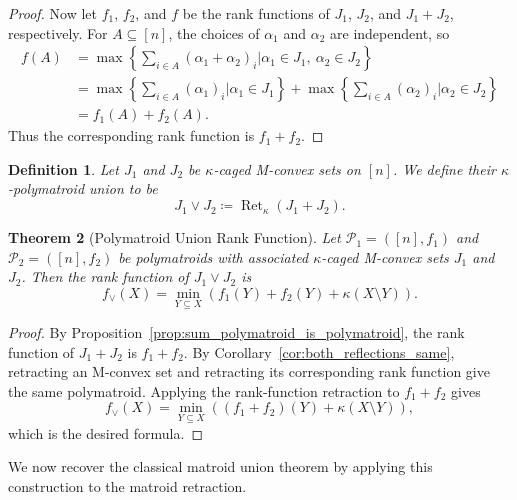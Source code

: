 \documentclass[10pt,a4paper]{amsart}
\newtheorem{theorem}{Theorem}[section]
\newtheorem{definition}[theorem]{Definition}
\DeclareMathOperator{\Ret}{Ret}                %
\newcommand{\RetK}{\Ret_{\kappa}}              %
\begin{document}
\begin{proof}
    Now let $f_1$, $f_2$, and $f$ be the rank functions of $J_1$, $J_2$,
    and $J_1+J_2$, respectively. For $A\subseteq[n]$, the choices of
    $\alpha_1$ and $\alpha_2$ are independent, so
    \begin{align*}
        f(A)
        &=
        \max\left\{
            \sum_{i\in A}(\alpha_1+\alpha_2)_i
            \mathrel{\Big|}
            \alpha_1\in J_1,\ \alpha_2\in J_2
        \right\}\\
        &=
        \max\left\{
            \sum_{i\in A}(\alpha_1)_i
            \mathrel{\Big|}
            \alpha_1\in J_1
        \right\}
        +
        \max\left\{
            \sum_{i\in A}(\alpha_2)_i
            \mathrel{\Big|}
            \alpha_2\in J_2
        \right\}\\
        &=f_1(A)+f_2(A).
    \end{align*}
    Thus the corresponding rank function is $f_1+f_2$.
\end{proof}

\begin{definition}
    Let $J_1$ and $J_2$ be $\kappa$-caged M-convex sets on $[n]$. We
    define their \emph{$\kappa$-polymatroid union} to be
    \[
        J_1\vee J_2\coloneqq\RetK(J_1+J_2).
    \]
\end{definition}

\begin{theorem}[Polymatroid Union Rank Function]
\label{thm:polymatroid_union_rank}
    Let $\mathcal{P}_1=([n],f_1)$ and
    $\mathcal{P}_2=([n],f_2)$ be polymatroids with associated
    $\kappa$-caged M-convex sets $J_1$ and $J_2$. Then the rank function
    of $J_1\vee J_2$ is
    \[
        f_\vee(X)
        =
        \min_{Y\subseteq X}
        \left(
            f_1(Y)+f_2(Y)+\kappa(X\setminus Y)
        \right).
    \]
\end{theorem}

\begin{proof}
    By Proposition~\ref{prop:sum_polymatroid_is_polymatroid}, the rank
    function of $J_1+J_2$ is $f_1+f_2$. By
    Corollary~\ref{cor:both_reflections_same}, retracting an M-convex set
    and retracting its corresponding rank function give the same
    polymatroid. Applying the rank-function retraction to $f_1+f_2$ gives
    \[
        f_\vee(X)
        =
        \min_{Y\subseteq X}
        \left(
            (f_1+f_2)(Y)+\kappa(X\setminus Y)
        \right),
    \]
    which is the desired formula.
\end{proof}

We now recover the classical matroid union theorem by applying this
construction to the matroid retraction.
\end{document}
